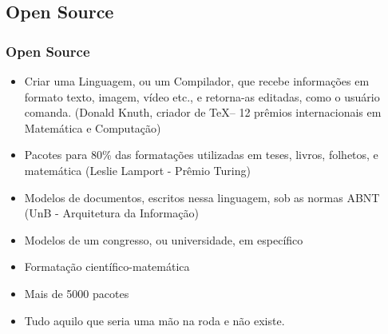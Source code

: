 \documentclass{beamer}
\begin{document}
\begin{frame}

  \section{Open Source}
  \frametitle{
    {{\textcolor{red}{{\LARGE{}}}} %
      \textcolor{red!85!black}{Open Source}}}


  \begin{tcolorbox}[colback=blue!5!white, colframe=violet!65!white,
    left*=1mm, fontupper=\fontsize{4mm}{4mm},
    title={\sc{\bf{Questões já resolvidas}}}]

    \begin{itemize}
    \item<3->[{\textcolor{violet!70!white}{\ding{166}}}]\alert{Criar} uma Linguagem, ou um Compilador, que recebe informações em formato
      texto, imagem, vídeo etc., e retorna-as editadas, como o
      usuário comanda. (Donald Knuth, criador de \TeX -- 12 prêmios
      internacionais em Matemática e Computação)
    \item<4->[{\textcolor{violet!70!white}{\ding{166}}}] Pacotes para 80\% das formatações utilizadas em teses,
      livros, folhetos, e matemática (Leslie Lamport - Prêmio Turing)
    \item<5->[{\textcolor{violet!70!white}{\ding{166}}}]{Modelos de documentos, escritos nessa linguagem, sob as
        normas  ABNT} (UnB - Arquitetura da Informação)
    \item<6->[{\textcolor{violet!70!white}{\ding{166}}}]{Modelos de um congresso, ou universidade, em específico}
    \item<6->[{\textcolor{violet!70!white}{\ding{166}}}]{Formatação científico-matemática}
    \item<6->[{\textcolor{violet!70!white}{\ding{166}}}]{Mais de 5000 pacotes}
    \end{itemize}

  \end{tcolorbox}

  \begin{tcolorbox}[title=O que ainda falta?]

    \begin{itemize}
    \item<1->[{\textcolor{blue!50!black}{\ding{69}}}] Tudo aquilo que seria uma mão na roda \alert{e} não
      existe.
    \end{itemize}

  \end{tcolorbox}

\end{frame}
\end{document}
